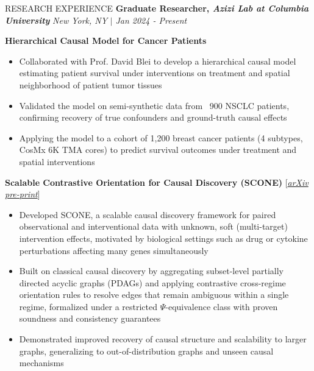 \documentclass{resume} %
\begin{document}
\begin{rSection}{RESEARCH EXPERIENCE}
\textbf{Graduate Researcher, \textit{Azizi Lab at Columbia University}} \hfill {\it New York, NY} \(|\) {\it Jan 2024 - Present}
\item {
    \textbf{Hierarchical Causal Model for Cancer Patients}
    \begin{itemize}
        \itemsep -0.5em \vspace{-0.5em}
        \item Collaborated with Prof. David Blei to develop a hierarchical causal model estimating patient survival under interventions on treatment and spatial neighborhood of patient tumor tissues
        \item Validated the model on semi-synthetic data from ~900 NSCLC patients, confirming recovery of true confounders and ground-truth causal effects
        \item Applying the model to a cohort of 1,200 breast cancer patients (4 subtypes, CosMx 6K TMA cores) to predict survival outcomes under treatment and spatial interventions
    \end{itemize}

    \textbf{Scalable Contrastive Orientation for Causal Discovery (SCONE)} [\textit{\href{https://arxiv.org/abs/2603.03411v1}{arXiv pre-print}}]
    \begin{itemize}
        \itemsep -0.5em \vspace{-0.5em}
        \item Developed SCONE, a scalable causal discovery framework for paired observational and interventional data with unknown, soft (multi-target) intervention effects, motivated by biological settings such as drug or cytokine perturbations affecting many genes simultaneously
        \item Built on classical causal discovery by aggregating subset-level partially directed acyclic graphs (PDAGs) and applying contrastive cross-regime orientation rules to resolve edges that remain ambiguous within a single regime, formalized under a restricted $\Psi$-equivalence class with proven soundness and consistency guarantees
        \item Demonstrated improved recovery of causal structure and scalability to larger graphs, generalizing to out-of-distribution graphs and unseen causal mechanisms
\end{itemize}
    
}
\end{rSection}
\end{document}
